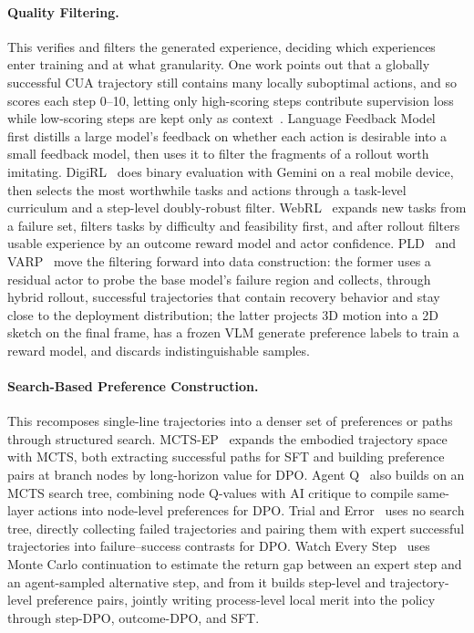 \paragraph{Quality Filtering.} This verifies and filters the generated experience, deciding which experiences enter training and at what granularity. One work points out that a globally successful CUA trajectory still contains many locally suboptimal actions, and so scores each step 0--10, letting only high-scoring steps contribute supervision loss while low-scoring steps are kept only as context~\cite{He25g}. Language Feedback Model~\cite{Zho24e} first distills a large model's feedback on whether each action is desirable into a small feedback model, then uses it to filter the fragments of a rollout worth imitating. DigiRL~\cite{Bai24} does binary evaluation with Gemini on a real mobile device, then selects the most worthwhile tasks and actions through a task-level curriculum and a step-level doubly-robust filter. WebRL~\cite{Qi24} expands new tasks from a failure set, filters tasks by difficulty and feasibility first, and after rollout filters usable experience by an outcome reward model and actor confidence. PLD~\cite{Xia25h} and VARP~\cite{Sin25b} move the filtering forward into data construction: the former uses a residual actor to probe the base model's failure region and collects, through hybrid rollout, successful trajectories that contain recovery behavior and stay close to the deployment distribution; the latter projects 3D motion into a 2D sketch on the final frame, has a frozen VLM generate preference labels to train a reward model, and discards indistinguishable samples.

\paragraph{Search-Based Preference Construction.} This recomposes single-line trajectories into a denser set of preferences or paths through structured search. MCTS-EP~\cite{Xu25q} expands the embodied trajectory space with MCTS, both extracting successful paths for SFT and building preference pairs at branch nodes by long-horizon value for DPO. Agent Q~\cite{Put24} also builds on an MCTS search tree, combining node Q-values with AI critique to compile same-layer actions into node-level preferences for DPO. Trial and Error~\cite{Son24} uses no search tree, directly collecting failed trajectories and pairing them with expert successful trajectories into failure--success contrasts for DPO. Watch Every Step~\cite{Xio24} uses Monte Carlo continuation to estimate the return gap between an expert step and an agent-sampled alternative step, and from it builds step-level and trajectory-level preference pairs, jointly writing process-level local merit into the policy through step-DPO, outcome-DPO, and SFT.

